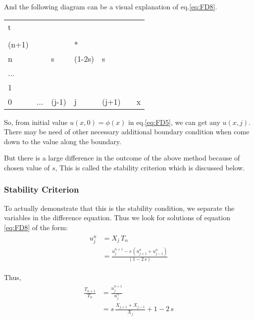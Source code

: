 \documentclass[../main.tex]{subfiles}
\begin{document}
And the following diagram can be a visual explanation of eq.\ref{eq:FD8}.
\begin{center}
\begin{tabular}{|P{3em} P{3em} P{3em} P{3em} P{3em} P{3em} P{3em}}
    t     &     &       &        &       & &   \\ 
          &     &       &        &       & &   \\
    (n+1) &     &       & *      &       & &   \\
    n     &     & s     & (1-2s) & s     & &   \\
    ...   &     &       &        &       & &   \\
    1     &     &       &        &       & &   \\
    0     & ... & (j-1) & j      & (j+1) & & x \\
    \hline
\end{tabular}
\end{center}

So, from initial value $u(x,0) = \phi(x)$ in eq.\ref{eq:FD5}, we can get any $u(x,j)$. There may be need of other necessary additional boundary condition when come down to the value along the boundary.

But there is a large difference in the outcome of the above method because of chosen value of $s$, This is called the stability criterion which is discussed below.

\subsubsection{Stability Criterion}

To actually demonstrate that this is the stability condition, we separate the variables in the difference equation. Thus we look for solutions of equation \ref{eq:FD8} of the form:
\begin{align}
    \begin{split} \label{eq:FD18}
        u_j^n &=  X_j \, T_n \\
              &= \frac{u_j^{n+1} - s \, (u_{j+1}^n + u_{j-1}^n)}{(1 - 2 \, s)}
    \end{split} 
\end{align}

Thus,
\begin{align}
    \begin{split} \label{eq:FD19}
    \frac{T_{n+1}}{T_n} &= \frac{u_j^{n+1}}{u_j^n} \\
                        &= s \, \frac{X_{j+1} + X_{j-1}}{X_j} + 1 - 2 \, s
    \end{split}
\end{align}
\end{document}
